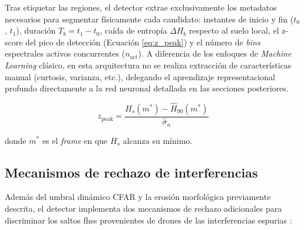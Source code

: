Tras etiquetar las regiones, el detector extrae exclusivamente los metadatos necesarios para segmentar físicamente cada candidato: instantes de inicio y fin ($t_0$, $t_1$), duración $T_b = t_1 - t_0$, caída de entropía $\Delta H_b$ respecto al suelo local, el z-score del pico de detección (Ecuación \ref{eq:z_peak}) y el número de \textit{bins} espectrales activos concurrentes ($n_{\text{act}}$). A diferencia de los enfoques de \textit{Machine Learning} clásico, en esta arquitectura no se realiza extracción de características manual (curtosis, varianza, etc.), delegando el aprendizaje representacional profundo directamente a la red neuronal detallada en las secciones posteriores.

\begin{equation}
    z_{\text{peak}} = \frac{H_s(m^*) - \widehat{H}_{90}(m^*)}{\hat{\sigma}_n}
    \label{eq:z_peak}
\end{equation}

donde $m^*$ es el \textit{frame} en que $H_s$ alcanza su mínimo.

\subsection{Mecanismos de rechazo de interferencias}
\label{subsec:filtros_rechazo}

Además del umbral dinámico CFAR y la erosión morfológica previamente descrita, el detector implementa dos mecanismos de rechazo adicionales para discriminar los saltos \gls{fhss} provenientes de drones de las interferencias espurias \cite{ezuma_detection_2020}:

